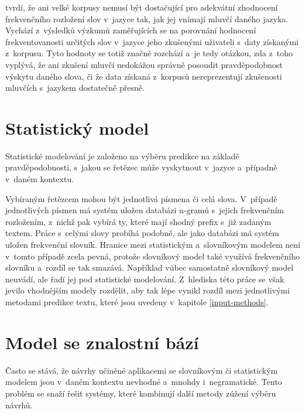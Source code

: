 \documentclass[a4paper,11pt,openany]{book} %
\begin{document}
\parencite{alderson2007judging} tvrdí, že ani velké korpusy nemusí být dostačující pro adekvátní zhodnocení frekvenčního rozložení slov v~jazyce tak, jak jej vnímají mluvčí daného jazyka. Vychází z~výsledků výzkumů zaměřujících se na porovnání hodnocení frekventovanosti určitých slov v~jazyce jeho zkušenými uživateli s~daty získanými z~korpusu. Tyto hodnoty se totiž značně rozchází a~je tedy otázkou, zda z~toho vyplývá, že ani zkušení mluvčí nedokážou správně posoudit pravděpodobnost výskytu daného slova, či že data získaná z~korpusů nereprezentují zkušenosti mluvčích s~jazykem dostatečně přesně.

\section{Statistický model}

Statistické modelování je založeno na výběru predikce na základě pravděpodobnosti, s~jakou se řetězec může vyskytnout v~jazyce a~případně v~daném kontextu. \parencite[5233]{ghayoomi2009overview}

Vybíraným řetězcem mohou být jednotlivá písmena či celá slova. V~případě jednotlivých písmen má systém uložen databázi n-gramů s~jejich frekvenčním rozložením, z~nichž pak vybírá ty, které mají shodný prefix s~již zadaným textem. Práce s~celými slovy probíhá podobně, ale jako databázi má systém uložen frekvenční slovník. Hranice mezi statistickým a~slovníkovým modelem není v~tomto případě zcela pevná, protože slovníkový model také využívá frekvenčního slovníku a~rozdíl se tak smazává. Například \parencite[5234]{ghayoomi2009overview} vůbec samostatně slovníkový model neuvádí, ale řadí jej pod statistické modelování. Z~hlediska této práce se však jevilo vhodnějším modely rozdělit, aby tak lépe vynikl rozdíl mezi jednotlivými metodami predikce textu, které jsou uvedeny v~kapitole \ref{input-methods}.

\section{Model se znalostní bází}

Často se stává, že návrhy učiněné aplikacemi se slovníkovým či statistickým modelem jsou v~daném kontextu nevhodné a~mnohdy i~negramatické. Tento problém se snaží řešit systémy, které kombinují další metody zúžení výběru návrhů. 
\end{document}
